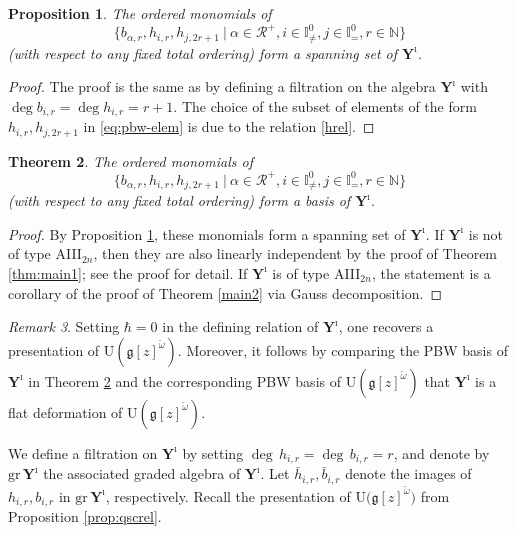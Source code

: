 \documentclass[11pt,reqno]{amsart}
\numberwithin{equation}{section}
\newtheorem{thm}{Theorem}[section]
\newtheorem{prop}[thm]{Proposition}
\theoremstyle{definition}
\theoremstyle{remark}
\newtheorem{rem}[thm]{Remark}
\newcommand{\beq}{\begin{equation}}
\newcommand{\eeq}{\end{equation}}
\newcommand{\cR}{\mathcal{R}}
\newcommand{\g}{\mathfrak{g}}
\newcommand{\gr}{{\mathrm{gr}}}
\newcommand{\rU}{{\mathrm{U}}}
\newcommand{\Yi}{{\mathbf{Y}^\imath}}
\def \h{\hbar}
\def \H{h}
\def \X{b}
\def \I{\mathbb{I}}
\def \N{\mathbb{N}}
\begin{document}
\begin{prop}\label{prop:span}
The ordered monomials of 
\beq\label{eq:pbw-elem}
\{b_{\alpha,r},h_{i,r},h_{j,2r+1}~|~\alpha\in\cR^+,i\in\I^0_{\ne},j\in\I_=^0,r\in\N\}
\eeq
(with respect to any fixed total ordering) form a spanning set of $\Yi$.
\end{prop}

\begin{proof}
The proof is the same as \cite[Prop. 4.5]{KLWZ23b} by defining a filtration on the algebra $\Yi$ with $\deg b_{i,r}=\deg h_{i,r}=r+1$. The choice of the subset of elements of the form $h_{i,r},h_{j,2r+1}$ in \eqref{eq:pbw-elem} is due to the relation \eqref{hrel}.
\end{proof}


\begin{thm}\label{thm:pbw}
The ordered monomials of 
$$
\{b_{\alpha,r},h_{i,r},h_{j,2r+1}~|~\alpha\in\cR^+,i\in\I^0_{\ne},j\in\I_{=}^0,r\in\N\}
$$ 
(with respect to any fixed total ordering) form a basis of $\Yi$. %
\end{thm}

\begin{proof}
By Proposition \ref{prop:span}, these monomials form a spanning set of $\Yi$. If $\Yi$ is not of type AIII$_{2n}$, then they are also linearly independent by the proof of Theorem \ref{thm:main1}; see the proof \cite[Thm. 4.10]{KLWZ23b} for detail. If $\Yi$ is of type AIII$_{2n}$, the statement is a corollary of the proof of Theorem \ref{main2} via Gauss decomposition.
\end{proof}

\begin{rem}
Setting $\h=0$ in the defining relation of $\Yi$, one recovers a presentation of $\rU(\g[z]^{\check\omega})$. Moreover, it follows by comparing the PBW basis of $\Yi$ in Theorem \ref{thm:pbw} and the corresponding PBW basis of  $\rU(\g[z]^{\check\omega})$ that $\Yi$ is a flat deformation of $\rU(\g[z]^{\check\omega})$.
\end{rem}

We define a filtration on $\Yi$ by setting $\deg \, \H_{i,r}=\deg \, \X_{i,r}=r$, and denote by ${\gr}\,\Yi$ the associated graded algebra of $\Yi$. Let $\bar{\H}_{i,r}, \bar{\X}_{i,r}$ denote the images of $\H_{i,r},\X_{i,r}$ in  ${\mathrm{gr}}\,\Yi$, respectively. Recall the presentation of $\rU\big(\g[z]^{\check\omega}\big)$ from Proposition \ref{prop:qscrel}.
\end{document}
